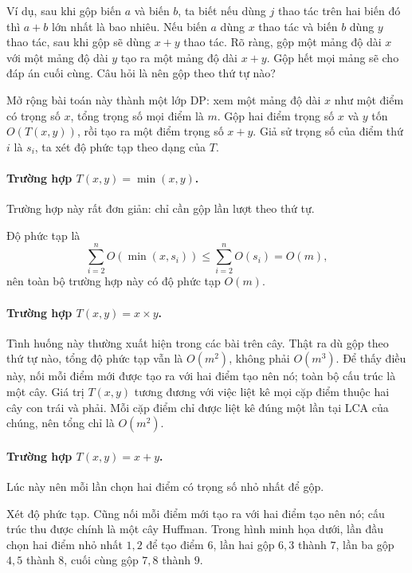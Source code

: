 \documentclass[11pt]{article}
\begin{document}
Ví dụ, sau khi gộp biến \(a\) và biến \(b\), ta biết nếu dùng \(j\) thao tác
trên hai biến đó thì \(a+b\) lớn nhất là bao nhiêu. Nếu biến \(a\) dùng \(x\)
thao tác và biến \(b\) dùng \(y\) thao tác, sau khi gộp sẽ dùng \(x+y\) thao
tác. Rõ ràng, gộp một mảng độ dài \(x\) với một mảng độ dài \(y\) tạo ra một
mảng độ dài \(x+y\). Gộp hết mọi mảng sẽ cho đáp án cuối cùng. Câu hỏi là nên
gộp theo thứ tự nào?

Mở rộng bài toán này thành một lớp DP: xem một mảng độ dài \(x\) như một điểm có
trọng số \(x\), tổng trọng số mọi điểm là \(m\). Gộp hai điểm trọng số \(x\) và
\(y\) tốn \(O(T(x,y))\), rồi tạo ra một điểm trọng số \(x+y\). Giả sử trọng số
của điểm thứ \(i\) là \(s_i\), ta xét độ phức tạp theo dạng của \(T\).

\paragraph{Trường hợp \(T(x,y)=\min(x,y)\).}
Trường hợp này rất đơn giản: chỉ cần gộp lần lượt theo thứ tự.

Độ phức tạp là
\[
  \sum_{i=2}^{n}O(\min(x,s_i))\le \sum_{i=2}^{n}O(s_i)=O(m),
\]
nên toàn bộ trường hợp này có độ phức tạp \(O(m)\).

\paragraph{Trường hợp \(T(x,y)=x\times y\).}
Tình huống này thường xuất hiện trong các bài trên cây. Thật ra dù gộp theo thứ
tự nào, tổng độ phức tạp vẫn là \(O(m^2)\), không phải \(O(m^3)\). Để thấy điều
này, nối mỗi điểm mới được tạo ra với hai điểm tạo nên nó; toàn bộ cấu trúc là
một cây. Giá trị \(T(x,y)\) tương đương với việc liệt kê mọi cặp điểm thuộc hai
cây con trái và phải. Mỗi cặp điểm chỉ được liệt kê đúng một lần tại LCA của
chúng, nên tổng chỉ là \(O(m^2)\).

\paragraph{Trường hợp \(T(x,y)=x+y\).}
Lúc này nên mỗi lần chọn hai điểm có trọng số nhỏ nhất để gộp.

Xét độ phức tạp. Cũng nối mỗi điểm mới tạo ra với hai điểm tạo nên nó; cấu trúc
thu được chính là một cây Huffman. Trong hình minh họa dưới, lần đầu chọn hai
điểm nhỏ nhất \(1,2\) để tạo điểm \(6\), lần hai gộp \(6,3\) thành \(7\), lần
ba gộp \(4,5\) thành \(8\), cuối cùng gộp \(7,8\) thành \(9\).
\end{document}
